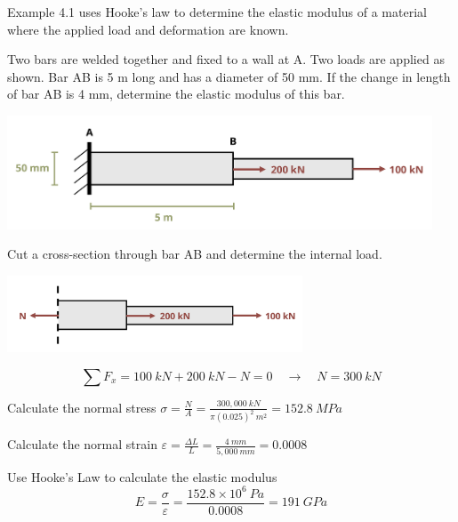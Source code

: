 \documentclass[
  letterpaper,
  DIV=11,
  numbers=noendperiod]{scrreprt}
\begin{document}
Example 4.1 uses Hooke's law to determine the elastic modulus of a
material where the applied load and deformation are known.

\begin{tcolorbox}[enhanced jigsaw, breakable, opacityback=0, toptitle=1mm, left=2mm, colback=white, opacitybacktitle=0.6, colframe=quarto-callout-tip-color-frame, titlerule=0mm, arc=.35mm, leftrule=.75mm, bottomtitle=1mm, colbacktitle=quarto-callout-tip-color!10!white, rightrule=.15mm, title={Example 4.1}, bottomrule=.15mm, toprule=.15mm, coltitle=black]

Two bars are welded together and fixed to a wall at A. Two loads are
applied as shown. Bar AB is 5 m long and has a diameter of 50 mm. If the
change in length of bar AB is 4 mm, determine the elastic modulus of
this bar.

\begin{center}
\includegraphics[width=4.97917in,height=\textheight]{images/CH4 PNGs/example 4.1 part 1.png}
\end{center}

\begin{tcolorbox}[enhanced jigsaw, breakable, opacityback=0, toptitle=1mm, left=2mm, colback=white, opacitybacktitle=0.6, colframe=quarto-callout-tip-color-frame, titlerule=0mm, arc=.35mm, leftrule=.75mm, bottomtitle=1mm, colbacktitle=quarto-callout-tip-color!10!white, rightrule=.15mm, title={Solution}, bottomrule=.15mm, toprule=.15mm, coltitle=black]

Cut a cross-section through bar AB and determine the internal load.

\begin{center}
\includegraphics[width=3.45833in,height=\textheight]{images/CH4 PNGs/example 4.1 part 2.png}
\end{center}

\[
\sum F_x= 100{~kN}+200{~kN}-N=0 \quad\rightarrow\quad N=300{~kN}
\]

Calculate the normal stress
\(\sigma=\frac{N}{A}=\frac{300,000{~kN}}{\pi(0.025)^2{~m}^2}=152.8{~MPa}\)

Calculate the normal strain
\(\varepsilon=\frac{\Delta L}{L}=\frac{4{~mm}}{5,000{~mm}}=0.0008\)

Use Hooke's Law to calculate the elastic modulus \[
E=\frac{\sigma}{\varepsilon}=\frac{152.8 \times 10^6{~Pa}}{0.0008}=191{~GPa}
\]

\end{tcolorbox}

\end{tcolorbox}
\end{document}
